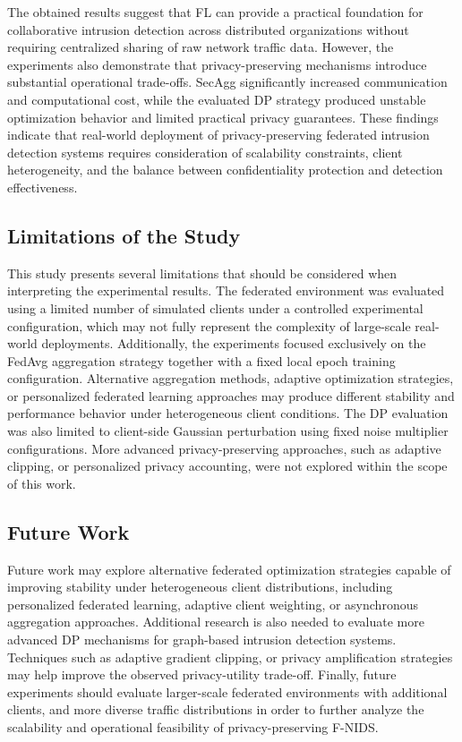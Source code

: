 \documentclass[conference]{IEEEtran}
\begin{document}
The obtained results suggest that FL can provide a practical foundation for collaborative intrusion detection across distributed organizations without requiring centralized sharing of raw network traffic data. However, the experiments also demonstrate that privacy-preserving mechanisms introduce substantial operational trade-offs. SecAgg significantly increased communication and computational cost, while the evaluated DP strategy produced unstable optimization behavior and limited practical privacy guarantees. These findings indicate that real-world deployment of privacy-preserving federated intrusion detection systems requires consideration of scalability constraints, client heterogeneity, and the balance between confidentiality protection and detection effectiveness.

\subsection{Limitations of the Study}

This study presents several limitations that should be considered when interpreting the experimental results. The federated environment was evaluated using a limited number of simulated clients under a controlled experimental configuration, which may not fully represent the complexity of large-scale real-world deployments. Additionally, the experiments focused exclusively on the FedAvg aggregation strategy together with a fixed local epoch training configuration. Alternative aggregation methods, adaptive optimization strategies, or personalized federated learning approaches may produce different stability and performance behavior under heterogeneous client conditions. The DP evaluation was also limited to client-side Gaussian perturbation using fixed noise multiplier configurations. More advanced privacy-preserving approaches, such as adaptive clipping, or personalized privacy accounting, were not explored within the scope of this work.

\subsection{Future Work}

Future work may explore alternative federated optimization strategies capable of improving stability under heterogeneous client distributions, including personalized federated learning, adaptive client weighting, or asynchronous aggregation approaches. Additional research is also needed to evaluate more advanced DP mechanisms for graph-based intrusion detection systems. Techniques such as adaptive gradient clipping, or privacy amplification strategies may help improve the observed privacy-utility trade-off. Finally, future experiments should evaluate larger-scale federated environments with additional clients, and more diverse traffic distributions in order to further analyze the scalability and operational feasibility of privacy-preserving F-NIDS.
\end{document}
